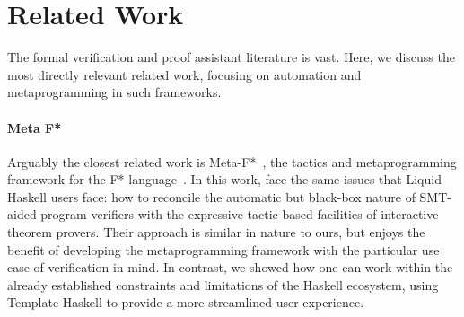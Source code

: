 \section{Related Work}
\label{sec:related}

The formal verification and proof assistant literature is vast. Here, we discuss
the most directly relevant related work, focusing on automation and metaprogramming
in such frameworks.

\paragraph{Meta F*}
Arguably the closest related work is Meta-F*~\cite{MetaF}, the tactics
and metaprogramming framework for the F* language~\cite{fstar}. In
this work, \citeauthor{MetaF} face the same issues that Liquid Haskell
users face: how to reconcile the automatic but black-box nature of
SMT-aided program verifiers with the expressive tactic-based facilities of
interactive theorem provers. Their approach is similar in nature to ours,
but enjoys the benefit of developing the metaprogramming framework with
the particular use case of verification in mind. In contrast, we showed
how one can work within the already established constraints and limitations
of the Haskell ecosystem, using Template Haskell to provide a more
streamlined user experience.

